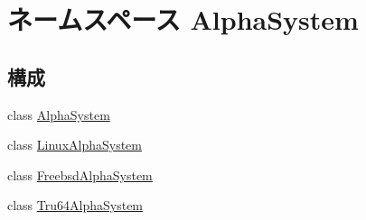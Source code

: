 \hypertarget{namespaceAlphaSystem}{
\section{ネームスペース AlphaSystem}
\label{namespaceAlphaSystem}
}
\subsection*{構成}
\begin{DoxyCompactItemize}
\item 
class \hyperlink{classAlphaSystem_1_1AlphaSystem}{AlphaSystem}
\item 
class \hyperlink{classAlphaSystem_1_1LinuxAlphaSystem}{LinuxAlphaSystem}
\item 
class \hyperlink{classAlphaSystem_1_1FreebsdAlphaSystem}{FreebsdAlphaSystem}
\item 
class \hyperlink{classAlphaSystem_1_1Tru64AlphaSystem}{Tru64AlphaSystem}
\end{DoxyCompactItemize}
